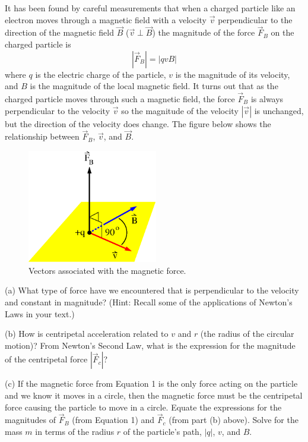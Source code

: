 It has been found by careful measurements that when a charged particle like an electron moves through a magnetic
field with a velocity $\vec v$ perpendicular to the direction of the magnetic field $\vec B$ ($\vec v \perp \vec B$) 
the magnitude of the force $\vec F_B$ on the charged particle is
\begin{equation}
|\vec F_B| = |q v B|
\end{equation}
where $q$ is the electric charge of the particle, $v$ is the magnitude of its velocity,
and $B$ is the magnitude of the local magnetic field.
It turns out that as the charged particle moves through such a magnetic field, the force $\vec F_B$ is always perpendicular
to the velocity $\vec v$ so the magnitude of the velocity $|\vec v|$ is unchanged, but the direction of the velocity does change.
The figure below shows the relationship between $\vec F_B$, $\vec v$,
and $\vec B$.
\vspace{5mm}

\begin{figure}[h!]
\begin{center}
\includegraphics[height=1.95in]{eoverm2/vCrossB.eps}
\caption{Vectors associated with the magnetic force. \hfill}
\end{center}
\end{figure}

(a) What type of force have we encountered 
that is perpendicular to the velocity and constant in magnitude?
(Hint: Recall some of the applications of Newton's Laws in your text.)
\vspace{15mm}

(b) How is centripetal acceleration related to $v$ and $r$ (the radius of the
circular motion)? From Newton's Second Law, what is the expression for the magnitude of
the centripetal force $|\vec F_c|$?
\vspace{15mm}

(c) If the magnetic force from Equation 1 is the only force acting on the particle and we know it moves in a circle, then the magnetic force must be the centripetal force causing the particle to move in a circle.  Equate the expressions for the magnitudes of $\vec F_B$ (from Equation 1) and
$\vec F_c$ (from part (b) above).
Solve for the mass $m$ in terms of the radius $r$ of the particle's path,
$|q|$, $v$, and $B$.
\vspace{45mm}


